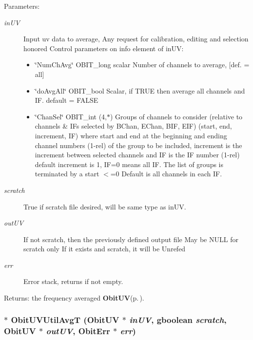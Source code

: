 \begin{Desc}
\item[Parameters:]
\begin{description}
\item[{\em in\-UV}]Input uv data to average, Any request for calibration, editing and selection honored Control parameters on info element of in\-UV: \begin{itemize}
\item \char`\"{}Num\-Ch\-Avg\char`\"{} OBIT\_\-long scalar Number of channels to average, [def. = all] \item \char`\"{}do\-Avg\-All\char`\"{} OBIT\_\-bool Scalar, if TRUE then average all channels and IF. default = FALSE \item \char`\"{}Chan\-Sel\char`\"{} OBIT\_\-int (4,$\ast$) Groups of channels to consider (relative to channels \& IFs selected by BChan, EChan, BIF, EIF) (start, end, increment, IF) where start and end at the beginning and ending channel numbers (1-rel) of the group to be included, increment is the increment between selected channels and IF is the IF number (1-rel) default increment is 1, IF=0 means all IF. The list of groups is terminated by a start $<$=0 Default is all channels in each IF.\end{itemize}
\item[{\em scratch}]True if scratch file desired, will be same type as in\-UV. \item[{\em out\-UV}]If not scratch, then the previously defined output file May be NULL for scratch only If it exists and scratch, it will be Unrefed \item[{\em err}]Error stack, returns if not empty. \end{description}
\end{Desc}
\begin{Desc}
\item[Returns:]the frequency averaged {\bf Obit\-UV}{\rm (p.\,\pageref{structObitUV})}. \end{Desc}
\subsubsection{$\ast$ Obit\-UVUtil\-Avg\-T ({\bf Obit\-UV} $\ast$ {\em in\-UV}, gboolean {\em scratch}, {\bf Obit\-UV} $\ast$ {\em out\-UV}, {\bf Obit\-Err} $\ast$ {\em err})}\label{ObitUVUtil_8c_a12}


